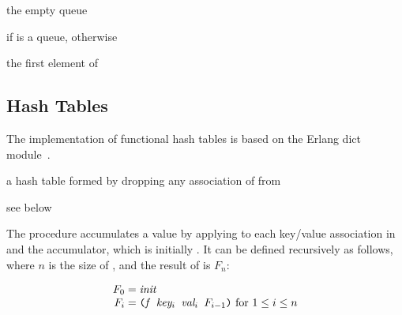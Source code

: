 \begin{syntax}
\end{syntax}
\returns{} the empty queue

\begin{procedure}
\end{procedure}
\returns{}  if  is a queue,  otherwise

\begin{procedure}
\end{procedure}
\returns{} the first element of 

\subsection{Hash Tables}

The implementation of functional hash tables is based on the Erlang
dict module~\cite{dict-ref,dynamic-hashing}.

\begin{procedure}
\end{procedure}
\returns{} a hash table formed by dropping any association of
 from 

\begin{procedure}
\end{procedure}
\returns{} see below

The  procedure accumulates a value by applying 
to each key/value association in  and the accumulator, which
is initially . It can be defined recursively as follows,
where $n$ is the size of , and the result of 
is $F_n$:

$$\begin{array}{r@{\;=\;}l}
F_0 & \var{init}\\
F_i & \code{(\var{f} \var{key$_i$} \var{val$_i$} $F_{i-1}$)}
\hbox{ for $1 \le i \le n$}\\
\end{array}$$

